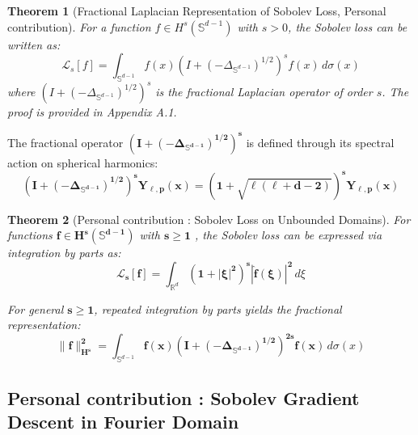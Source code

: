 \documentclass[a4paper]{article}
\theoremstyle{plain}
\newtheorem{theorem}{Theorem}[section]
\theoremstyle{definition}
\theoremstyle{remark}
\begin{document}
\begin{theorem}[Fractional Laplacian Representation of Sobolev Loss, Personal contribution]
\label{thm:fractional_sobolev}
For a function $f \in H^s(\mathbb{S}^{d-1})$ with $s > 0$, the Sobolev loss can be written as:
\begin{equation}
\label{eq:sobolev_fractional_rep}
\mathcal{L}_s[f] = \int_{\mathbb{S}^{d-1}} f(x) (I + (-\Delta_{\mathbb{S}^{d-1}})^{1/2})^s f(x) \, d\sigma(x)
\end{equation}
where $(I + (-\Delta_{\mathbb{S}^{d-1}})^{1/2})^s$ is the fractional Laplacian operator of order $s$. The proof is provided in Appendix A.1.
\end{theorem}

\begin{tcolorbox}[colback=green!5,colframe=blue!60!black,title=Spectral Action]
The fractional operator $\boldsymbol{(I + (-\Delta_{\mathbb{S}^{d-1}})^{1/2})^s}$ is defined through its spectral action on spherical harmonics:
\begin{equation}
\label{eq:fractional_spectral}
\boldsymbol{(I + (-\Delta_{\mathbb{S}^{d-1}})^{1/2})^s Y_{\ell,p}(x)} = \boldsymbol{(1 + \sqrt{\ell(\ell + d - 2)})^s Y_{\ell,p}(x)}
\end{equation}
\end{tcolorbox}

\begin{theorem}[Personal contribution : Sobolev Loss on Unbounded Domains]
\label{thm:sobolev_unbounded}
For functions $\boldsymbol{f \in H^s(\mathbb{S}^{d-1})}$ with $\boldsymbol{s \geq 1}$ , the Sobolev loss can be expressed via integration by parts as:
\begin{equation}
\label{eq:sobolev_unbounded}
\boldsymbol{\mathcal{L}_s[f]} = \int_{\mathbb{R}^d} \boldsymbol{(1 + |\xi|^2)^s} \boldsymbol{|\hat{f}(\xi)|^2} \, d\xi
\end{equation}

For general $\boldsymbol{s \geq 1}$, repeated integration by parts yields the fractional representation:
\begin{equation}
\label{eq:sobolev_general}
\boldsymbol{\|f\|_{H^s}^2} = \int_{\mathbb{S}^{d-1}} \boldsymbol{f(x)} \boldsymbol{(I + (-\Delta_{\mathbb{S}^{d-1}})^{1/2})^{2s}} \boldsymbol{f(x)} \, d\sigma(x)
\end{equation}
\end{theorem}





\subsection{Personal contribution : Sobolev Gradient Descent in Fourier Domain}
\end{document}
